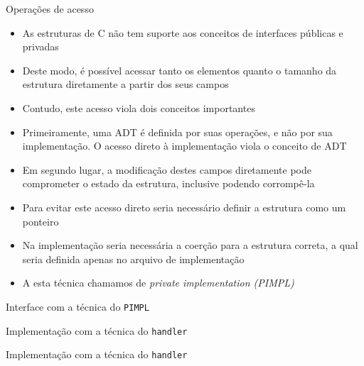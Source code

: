 \begin{frame}[fragile]{Operações de acesso}

    \begin{itemize}
        \item As estruturas de C não tem suporte aos conceitos de interfaces públicas e privadas

        \item Deste modo, é possível acessar tanto os elementos quanto o tamanho da estrutura
        diretamente a partir dos seus campos

        \item Contudo, este acesso viola dois conceitos importantes

        \item Primeiramente, uma ADT é definida por suas operações, e não por sua implementação.
        O acesso direto à implementação viola o conceito de ADT

        \item Em segundo lugar, a modificação destes campos diretamente pode comprometer o estado
        da estrutura, inclusive podendo corrompê-la

        \item Para evitar este acesso direto seria necessário definir a estrutura como um ponteiro

        \item Na implementação seria necessária a coerção para a estrutura correta, a qual seria 
        definida apenas no arquivo de implementação

        \item A esta técnica chamamos de \textit{private implementation (PIMPL)}
    \end{itemize}

\end{frame}

\begin{frame}[fragile]{Interface com a técnica do \texttt{PIMPL}}
\end{frame}

\begin{frame}[fragile]{Implementação com a técnica do \texttt{handler}}
\end{frame}

\begin{frame}[fragile]{Implementação com a técnica do \texttt{handler}}
\end{frame}

